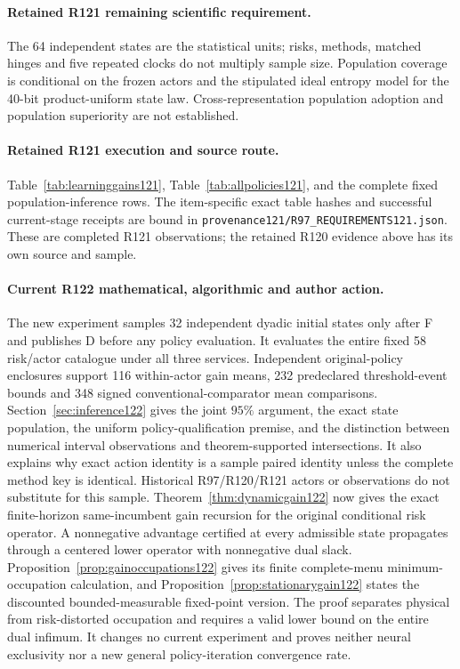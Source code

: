 \paragraph{Retained R121 remaining scientific requirement.}
The 64 independent states are the statistical units; risks, methods, matched hinges and five repeated clocks do not multiply sample size. Population coverage is conditional on the frozen actors and the stipulated ideal entropy model for the 40-bit product-uniform state law. Cross-representation population adoption and population superiority are not established.

\paragraph{Retained R121 execution and source route.}
Table~\ref{tab:learninggains121}, Table~\ref{tab:allpolicies121}, and the complete fixed population-inference rows.
The item-specific exact table hashes and successful current-stage receipts are bound in \nolinkurl{provenance121/R97_REQUIREMENTS121.json}. These are completed R121 observations; the retained R120 evidence above has its own source and sample.
\paragraph{Current R122 mathematical, algorithmic and author action.}
The new experiment samples 32 independent dyadic initial states only after F and publishes D before any policy evaluation. It evaluates the entire fixed 58 risk/actor catalogue under all three services. Independent original-policy enclosures support 116 within-actor gain means, 232 predeclared threshold-event bounds and 348 signed conventional-comparator mean comparisons. Section~\ref{sec:inference122} gives the joint $95\%$ argument, the exact state population, the uniform policy-qualification premise, and the distinction between numerical interval observations and theorem-supported intersections. It also explains why exact action identity is a sample paired identity unless the complete method key is identical. Historical R97/R120/R121 actors or observations do not substitute for this sample. Theorem~\ref{thm:dynamicgain122} now gives the exact finite-horizon same-incumbent gain recursion for the original conditional risk operator. A nonnegative advantage certified at every admissible state propagates through a centered lower operator with nonnegative dual slack. Proposition~\ref{prop:gainoccupations122} gives its finite complete-menu minimum-occupation calculation, and Proposition~\ref{prop:stationarygain122} states the discounted bounded-measurable fixed-point version. The proof separates physical from risk-distorted occupation and requires a valid lower bound on the entire dual infimum. It changes no current experiment and proves neither neural exclusivity nor a new general policy-iteration convergence rate.
